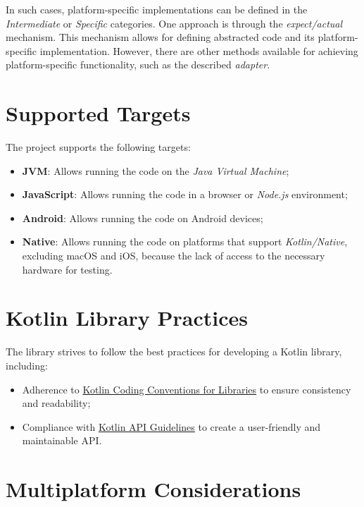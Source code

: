 In such cases,
platform-specific implementations can be defined in the \textit{Intermediate} or \textit{Specific} categories.
One approach is through the \textit{expect/actual}~\cite{kmp-expect-actual} mechanism.
This mechanism allows for defining abstracted code and its platform-specific implementation.
However, there are other methods available for achieving platform-specific functionality,
such as the described \textit{adapter}.


\section{Supported Targets}\label{sec:supported-targets}

The project supports the following targets:

\begin{itemize}
    \item \textbf{JVM}: Allows running the code on the \textit{Java Virtual Machine};
    \item \textbf{JavaScript}: Allows running the code in a browser or \textit{Node.js} environment;
    \item \textbf{Android}: Allows running the code on Android devices;
    \item \textbf{Native}: Allows running the code on platforms that support \textit{Kotlin/Native}, excluding macOS and iOS, because the lack of access to the necessary hardware for testing.
\end{itemize}


\section{Kotlin Library Practices}\label{sec:kotlin-library-practices}

The library strives to follow the best practices for developing a Kotlin library, including:

\begin{itemize}
    \item Adherence to \href{https://kotlinlang.org/docs/coding-conventions.html#coding-conventions-for-libraries}{Kotlin Coding Conventions for Libraries} to ensure consistency and readability;
    \item Compliance with \href{https://kotlinlang.org/docs/api-guidelines-introduction.html}{Kotlin API Guidelines} to create a user-friendly and maintainable API.
\end{itemize}


\section{Multiplatform Considerations}\label{sec:multiplatform-considerations}

